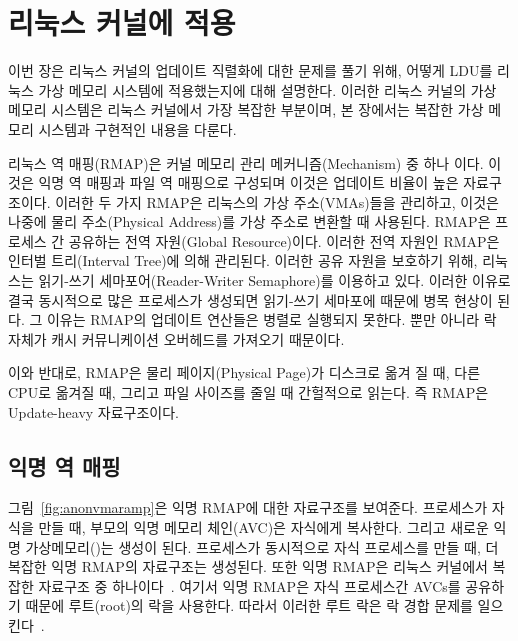 \newpage
\section{리눅스 커널에 적용}
\label{sec:linux}

이번 장은 리눅스 커널의 업데이트 직렬화에 대한 문제를 풀기 위해,
어떻게 LDU를 리눅스 가상 메모리 시스템에 적용했는지에 대해 설명한다.
이러한 리눅스 커널의 가상 메모리 시스템은 리눅스 커널에서 가장 복잡한 부분이며, 
본 장에서는 복잡한 가상 메모리 시스템과 구현적인 내용을 다룬다.

리눅스 역 매핑(RMAP)은 커널 메모리 관리 메커니즘(Mechanism) 중 하나 이다.
이것은 익명 역 매핑과 파일 역 매핑으로 구성되며 이것은 업데이트 비율이 높은 자료구조이다.
이러한 두 가지 RMAP은 리눅스의 가상 주소(VMAs)들을 관리하고, 이것은 나중에 물리 주소(Physical Address)를 
가상 주소로 변환할 때 사용된다.
RMAP은 프로세스 간 공유하는 전역 자원(Global Resource)이다.
이러한 전역 자원인 RMAP은 인터벌 트리(Interval Tree)에 의해 관리된다.
이러한 공유 자원을 보호하기 위해, 리눅스는 읽기-쓰기 세마포어(Reader-Writer Semaphore)를 이용하고 있다.
이러한 이유로 결국 동시적으로 많은 프로세스가 생성되면 읽기-쓰기 세마포에 때문에 병목 현상이 된다.
그 이유는 RMAP의 업데이트 연산들은 병렬로 실행되지 못한다. 
뿐만 아니라 락 자체가 캐시 커뮤니케이션 오버헤드를 가져오기 때문이다.

이와 반대로, RMAP은 물리 페이지(Physical Page)가 디스크로 옮겨 질 때, 다른 CPU로 옮겨질 때, 그리고 
파일 사이즈를 줄일 때 간헐적으로 읽는다. 
즉 RMAP은 Update-heavy 자료구조이다.

\subsection{익명 역 매핑}


그림~\ref{fig:anonvmaramp}은 익명 RMAP에 대한 자료구조를 보여준다.
프로세스가 자식을 만들 때, 부모의 익명 메모리 체인(AVC)은 자식에게 복사한다. 
그리고 새로운 익명 가상메모리()는 생성이 된다.
프로세스가 동시적으로 자식 프로세스를 만들 때, 더 복잡한 익명 RMAP의 자료구조는 생성된다.
또한 익명 RMAP은 리눅스 커널에서 복잡한 자료구조 중 하나이다~\cite{CorbetLWNANON}.
여기서 익명 RMAP은 자식 프로세스간 AVCs를 공유하기 때문에 루트(root)의 락을 사용한다.
따라서 이러한 루트 락은 락 경합 문제를 일으킨다~\cite{Andi2011adding}.  

